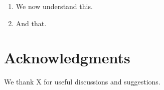 \documentclass[useAMS,usenatbib]{mn2e}
\begin{document}
\begin{enumerate}

\item We now understand this.

\item And that.

\end{enumerate}




\section*{Acknowledgments}
 
We thank X for useful discussions and suggestions.











\label{lastpage}
\bsp
\end{document}
